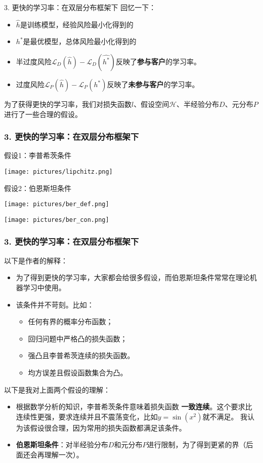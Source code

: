 \documentclass{beamer}
\begin{document}
\begin{frame}{3. 更快的学习率：在双层分布框架下}
    回忆一下：
    \pause
    \begin{itemize}
        \item $\hat{h}$是训练模型，经验风险最小化得到的
        \item $h^{*}$是最优模型，总体风险最小化得到的
        \pause
        \item 半过度风险$\mathcal{L}_{D}(\hat{h})-\mathcal{L}_{D}(\hat{h^{*}})$反映了\textbf{参与客户}的学习率。
        \item 过度风险$\mathcal{L}_{P}(\hat{h})-\mathcal{L}_{P}(h^{*})$反映了\textbf{未参与客户}的学习率。
    \end{itemize}
    为了获得更快的学习率，我们对损失函数$l$、假设空间$\mathcal{H}$、半经验分布$D$、元分布$P$进行了一些合理的假设。
\end{frame}
\begin{frame}
    \frametitle{3. 更快的学习率：在双层分布框架下}
    假设1：李普希茨条件
    \begin{center}
        \texttt{[image: pictures/lipchitz.png]}
    \end{center}
    \pause
    假设2：伯恩斯坦条件
    \begin{center}
        \texttt{[image: pictures/ber\_def.png]}
    \end{center}
    \begin{center}
        \texttt{[image: pictures/ber\_con.png]}
    \end{center}
\end{frame}
\begin{frame}
    \frametitle{3. 更快的学习率：在双层分布框架下}
    以下是作者的解释：
    \begin{itemize}
        \item 为了得到更快的学习率，大家都会给很多假设，而伯恩斯坦条件常常在理论机器学习中使用。
        \item 该条件并不苛刻。比如：
        \begin{itemize}
            \item 任何有界的概率分布函数；
            \item 回归问题中严格凸的损失函数；
            \item 强凸且李普希茨连续的损失函数。
            \item 均方误差且假设函数集合为凸。
        \end{itemize}
    \end{itemize}
    \pause
    以下是我对上面两个假设的理解：
    \begin{itemize}
        \item 根据数学分析的知识，李普希茨条件意味着损失函数
        \textbf{一致连续}。这个要求比连续性更强，要求连续并且不震荡变化，比如$y=\sin(x^{2})$就不满足。
        我认为该假设很合理，因为常用的损失函数都满足该条件。
        \item \textbf{伯恩斯坦条件}：对半经验分布$D$和元分布$P$进行限制，为了得到更紧的界（后面还会再理解一次）。
    \end{itemize}
\end{frame}
\end{document}
